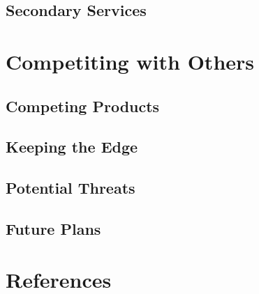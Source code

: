 \documentclass[a4paper,12pt]{article}
\begin{document}
\subsection{Secondary Services}

\section{Competiting with Others}

\subsection{Competing Products}

\subsection{Keeping the Edge}

\subsection{Potential Threats}

\subsection{Future Plans}

\section{References}




\end{document}
